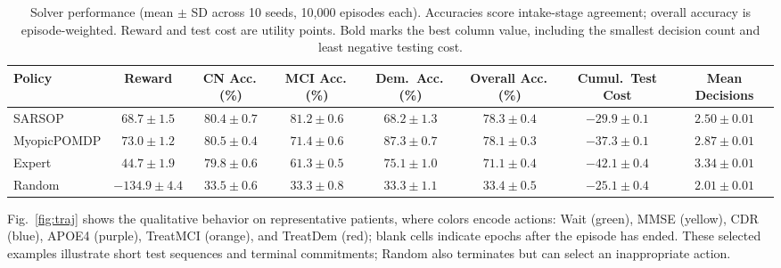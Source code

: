 \documentclass[conference,a4paper]{IEEEtran}
\begin{document}
\begin{table}[htbp]
\caption{Solver performance (mean $\pm$ SD across 10 seeds, 10,000 episodes each).
Accuracies score intake-stage agreement; overall accuracy is episode-weighted.
Reward and test cost are utility points. Bold marks the best column value,
including the smallest decision count and least negative testing cost.}
\label{tab:bench}
\begin{center}
\begin{tabular}{|l|c|c|c|c|c|c|c|}
\hline
Policy & Reward & CN Acc.\,(\%) & MCI Acc.\,(\%) & Dem.\ Acc.\,(\%) &
Overall Acc.\,(\%) & Cumul.\ Test Cost & Mean Decisions \\
\hline
SARSOP      & $68.7{\pm}1.5$ &
$80.4{\pm}0.7$ & $\mathbf{81.2{\pm}0.6}$ & $68.2{\pm}1.3$ &
$\mathbf{78.3{\pm}0.4}$ & $-29.9{\pm}0.1$ & $2.50{\pm}0.01$ \\
MyopicPOMDP & $\mathbf{73.0{\pm}1.2}$ &
$\mathbf{80.5{\pm}0.4}$ & $71.4{\pm}0.6$ & $\mathbf{87.3{\pm}0.7}$ &
$78.1{\pm}0.3$ & $-37.3{\pm}0.1$ & $2.87{\pm}0.01$ \\
Expert      & $44.7{\pm}1.9$ &
$79.8{\pm}0.6$ & $61.3{\pm}0.5$ & $75.1{\pm}1.0$ &
$71.1{\pm}0.4$ & $-42.1{\pm}0.4$ & $3.34{\pm}0.01$ \\
Random      & $-134.9{\pm}4.4$ &
$33.5{\pm}0.6$ & $33.3{\pm}0.8$ & $33.3{\pm}1.1$ &
$33.4{\pm}0.5$ & $\mathbf{-25.1{\pm}0.4}$ & $\mathbf{2.01{\pm}0.01}$ \\
\hline
\end{tabular}
\end{center}
\end{table}

Fig.~\ref{fig:traj} shows the qualitative behavior on representative
patients, where colors encode actions: Wait (green), MMSE (yellow),
CDR (blue), APOE4 (purple), TreatMCI (orange), and TreatDem (red);
blank cells indicate epochs after the episode has ended. These selected
examples illustrate short test sequences and terminal commitments;
Random also terminates but can select an inappropriate action.
\end{document}
